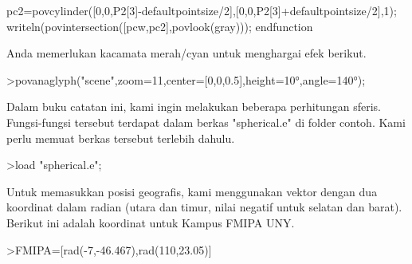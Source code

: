 \documentclass[a4paper,10pt]{article}
\begin{document}
\begin{eulernotebook}
\begin{eulercomment}
\begin{eulercomment}
\begin{eulercomment}
\begin{eulercomment}
\begin{eulercomment}
\begin{eulercomment}
\begin{eulercomment}
\begin{eulercomment}
\begin{eulercomment}
\begin{eulercomment}
\begin{eulercomment}
\begin{eulercomment}
\begin{eulercomment}
\begin{eulercomment}
\begin{eulercomment}
\begin{eulercomment}
\begin{eulercomment}
\begin{eulercomment}
\begin{eulercomment}
\begin{eulercomment}
\begin{eulercomment}
\begin{eulercomment}
\begin{eulercomment}
\begin{eulercomment}
\begin{eulercomment}
\begin{eulercomment}
\begin{eulercomment}
\begin{eulercomment}
\begin{eulercomment}
\begin{eulercomment}
\begin{eulercomment}
\begin{eulercomment}
\begin{eulercomment}
\begin{eulercomment}
\begin{eulercomment}
\begin{eulercomment}
\begin{eulercomment}
\begin{eulercomment}
\begin{eulercomment}
\begin{eulercomment}
\begin{eulercomment}
\begin{eulercomment}
\begin{eulerudf}
  pc2=povcylinder([0,0,P2[3]-defaultpointsize/2],[0,0,P2[3]+defaultpointsize/2],1);
  writeln(povintersection([pcw,pc2],povlook(gray)));
  endfunction
\end{eulerudf}
\begin{eulercomment}
Anda memerlukan kacamata merah/cyan untuk menghargai efek berikut.
\end{eulercomment}
\begin{eulerprompt}
>povanaglyph("scene",zoom=11,center=[0,0,0.5],height=10°,angle=140°);
\end{eulerprompt}
\begin{eulercomment}
Dalam buku catatan ini, kami ingin melakukan beberapa perhitungan
sferis. Fungsi-fungsi tersebut terdapat dalam berkas "spherical.e" di
folder contoh. Kami perlu memuat berkas tersebut terlebih dahulu.
\end{eulercomment}
\begin{eulerprompt}
>load "spherical.e";
\end{eulerprompt}
\begin{eulercomment}
Untuk memasukkan posisi geografis, kami menggunakan vektor dengan dua
koordinat dalam radian (utara dan timur, nilai negatif untuk selatan
dan barat). Berikut ini adalah koordinat untuk Kampus FMIPA UNY.
\end{eulercomment}
\begin{eulerprompt}
>FMIPA=[rad(-7,-46.467),rad(110,23.05)]
\end{eulerprompt}
\begin{euleroutput}

\end{euleroutput}
\end{eulercomment}
\end{eulercomment}
\end{eulercomment}
\end{eulercomment}
\end{eulercomment}
\end{eulercomment}
\end{eulercomment}
\end{eulercomment}
\end{eulercomment}
\end{eulercomment}
\end{eulercomment}
\end{eulercomment}
\end{eulercomment}
\end{eulercomment}
\end{eulercomment}
\end{eulercomment}
\end{eulercomment}
\end{eulercomment}
\end{eulercomment}
\end{eulercomment}
\end{eulercomment}
\end{eulercomment}
\end{eulercomment}
\end{eulercomment}
\end{eulercomment}
\end{eulercomment}
\end{eulercomment}
\end{eulercomment}
\end{eulercomment}
\end{eulercomment}
\end{eulercomment}
\end{eulercomment}
\end{eulercomment}
\end{eulercomment}
\end{eulercomment}
\end{eulercomment}
\end{eulercomment}
\end{eulercomment}
\end{eulercomment}
\end{eulercomment}
\end{eulercomment}
\end{eulercomment}
\end{eulernotebook}
\end{document}
